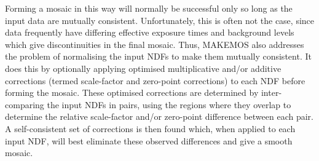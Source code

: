 {{      Forming a mosaic in this way will normally be successful only so
      long as the input data are mutually consistent. Unfortunately,
      this is often not the case, since data frequently have differing
      effective exposure times and background levels which give
      discontinuities in the final mosaic. Thus, MAKEMOS also addresses
      the problem of normalising the input NDFs to make them mutually
      consistent. It does this by optionally applying optimised
      multiplicative and/or additive corrections (termed scale-factor
      and zero-point corrections) to each NDF before forming the
      mosaic.  These optimised corrections are determined by
      inter-comparing the input NDFs in pairs, using the regions where
      they overlap to determine the relative scale-factor and/or
      zero-point difference between each pair.  A self-consistent set
      of corrections is then found which, when applied to each input
      NDF, will best eliminate these observed differences and give a
      smooth mosaic.
   }
   }
